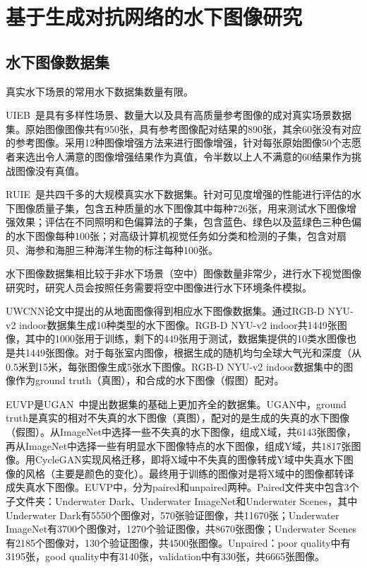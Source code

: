 \section{基于生成对抗网络的水下图像研究}
\subsection{水下图像数据集}
真实水下场景的常用水下数据集数量有限。

UIEB~\cite{anwar2018deep}是具有多样性场景、数量大以及具有高质量参考图像的成对真实场景数据集。原始图像图像共有950张，具有参考图像配对结果的890张，其余60张没有对应的参考图像。采用12种图像增强方法来进行图像增强，针对每张原始图像50个志愿者来选出令人满意的图像增强结果作为真值，令半数以上人不满意的60结果作为挑战图像没有真值。

RUIE~\cite{liu2019real}是共四千多的大规模真实水下数据集。针对可见度增强的性能进行评估的水下图像质量子集，包含五种质量的水下图像其中每种726张，用来测试水下图像增强效果；评估在不同照明和色偏算法的子集，包含蓝色、绿色以及蓝绿色三种色偏的水下图像每种100张；对高级计算机视觉任务如分类和检测的子集，包含对扇贝、海参和海胆三种海洋生物的标注每种100张。

水下图像数据集相比较于非水下场景（空中）图像数量非常少，进行水下视觉图像研究时，研究人员会按照任务需要将空中图像进行水下环境条件模拟。

UWCNN论文中提出的从地面图像得到相应水下图像数据集。通过RGB-D NYU-v2 indoor数据集生成10种类型的水下图像。RGB-D NYU-v2 indoor共1449张图像，其中的1000张用于训练，剩下的449张用于测试，数据集提供的10类水图像也是共1449张图像。对于每张室内图像，根据生成的随机均匀全球大气光和深度（从0.5米到15米，每张图像生成5张水下图像。RGB-D NYU-v2 indoor数据集中的图像作为ground truth（真图），和合成的水下图像（假图）配对。

EUVP是UGAN~\cite{fabbri2018enhancing}中提出数据集的基础上更加齐全的数据集。UGAN中，ground truth是真实的相对不失真的水下图像（真图），配对的是生成的失真的水下图像（假图）。从ImageNet中选择一些不失真的水下图像，组成X域，共6143张图像，再从ImageNet中选择一些有明显水下图像特点的水下图像，组成Y域，共1817张图像。用CycleGAN实现风格迁移，即将X域中不失真的图像转成Y域中失真水下图像的风格（主要是颜色的变化）。最终用于训练的图像对是将X域中的图像都转译成失真水下图像。EUVP中，分为paired和unpaired两种。Paired文件夹中包含3个子文件夹：Underwater Dark、Underwater ImageNet和Underwater Scenes，其中Underwater Dark有5550个图像对，570张验证图像，共11670张；Underwater ImageNet有3700个图像对，1270个验证图像，共8670张图像；Underwater Scenes有2185个图像对，130个验证图像，共4500张图像。Unpaired：poor quality中有3195张，good quality中有3140张，validation中有330张，共6665张图像。

